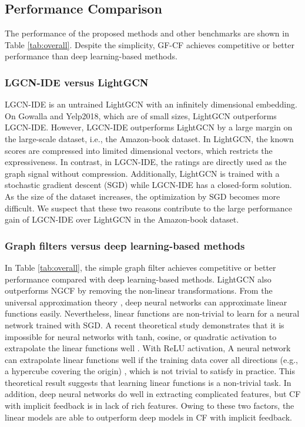 \documentclass[sigconf]{acmart}
\begin{document}
\subsection{Performance Comparison}
The performance of the proposed methods and other benchmarks are shown in Table \ref{tab:overall}. Despite the simplicity, GF-CF achieves competitive or better performance than deep learning-based methods. 


\subsubsection{LGCN-IDE versus LightGCN} LGCN-IDE is an untrained LightGCN with an infinitely dimensional embedding. On Gowalla and Yelp2018, which are of small sizes, LightGCN outperforms LGCN-IDE. However, LGCN-IDE outperforms LightGCN by a large margin on the large-scale dataset, i.e., the Amazon-book dataset. In LightGCN, the known scores are compressed into limited dimensional vectors, which restricts the expressiveness. In contrast, in LGCN-IDE, the ratings are directly used as the graph signal without compression. Additionally, LightGCN is trained with a stochastic gradient descent (SGD) while LGCN-IDE has a closed-form solution. As the size of the dataset increases, the optimization by SGD becomes more difficult. We suspect that these two reasons contribute to the large performance gain of LGCN-IDE over LightGCN in the Amazon-book dataset.

\subsubsection{Graph filters versus deep learning-based methods} In Table \ref{tab:overall}, the simple graph filter achieves competitive or better performance compared with deep learning-based methods. LightGCN also outperforms NGCF by removing the non-linear transformations. From the universal approximation theory \cite{hornik1989multilayer}, deep neural networks can approximate linear functions easily. Nevertheless, linear functions are non-trivial to learn for a neural network trained with SGD. A recent theoretical study demonstrates that it is impossible for neural networks with tanh, cosine, or quadratic activation to extrapolate the linear functions well \cite{xu2020neural}. With ReLU activation, A neural network can extrapolate linear functions well if the training data cover all directions (e.g., a hypercube covering the origin) \cite{xu2020neural}, which is not trivial to satisfy in practice. This theoretical result suggests that learning linear functions is a non-trivial task. In addition, deep neural networks do well in extracting complicated features, but CF with implicit feedback is in lack of rich features. Owing to these two factors, the linear models are able to outperform deep models in CF with implicit feedback.
\end{document}
